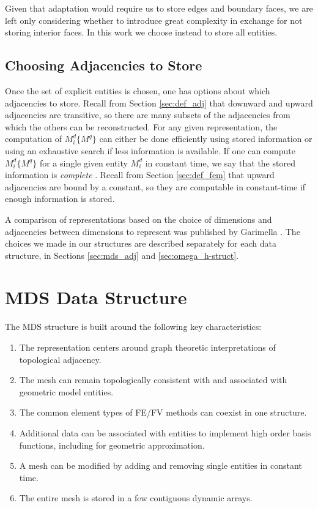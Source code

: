 Given that adaptation would require us to store edges and boundary
faces, we are left only considering whether to introduce great
complexity in exchange for not storing interior faces.
In this work we choose instead to store all entities.

\subsection{Choosing Adjacencies to Store}

Once the set of explicit entities is chosen, one has
options about which adjacencies to store.
Recall from Section \ref{sec:def_adj} that downward and upward
adjacencies are transitive, so there are many
subsets of the adjacencies from which the others
can be reconstructed.
For any given representation, the computation of $M^d_i\{M^q\}$
can either be done efficiently using stored information
or using an exhaustive search if less information is available.
If one can compute $M^d_i\{M^q\}$ for a single
given entity $M^d_i$ in constant time,
we say that the stored information is {\it complete} \cite{seol2006efficient}.
Recall from Section \ref{sec:def_fem} that upward adjacencies
are bound by a constant, so they are computable in
constant-time if enough information is stored.

A comparison of representations based on the choice
of dimensions and adjacencies between
dimensions to represent
was published by Garimella \cite{garimella2002mesh}.
The choices we made in our structures are described separately
for each data structure,
in Sections \ref{sec:mds_adj} and \ref{sec:omega_h-struct}.

\section{MDS Data Structure}
\label{sec:sisc}

The MDS structure is built around the following key characteristics:

\begin{enumerate}
\item The representation centers around graph theoretic interpretations
of topological adjacency.
\item The mesh can remain topologically consistent with and associated with
geometric model entities.
\item The common element types of FE/FV methods can coexist in one structure.
\item Additional data can be associated with entities to implement
high order basis functions, including for geometric approximation.
\item A mesh can be modified by adding and removing single entities in constant time.
\item The entire mesh is stored in a few contiguous dynamic arrays.
\end{enumerate}

